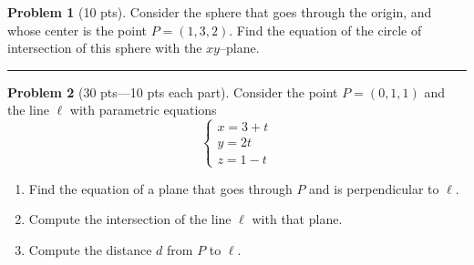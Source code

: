 \documentclass[12pt]{article}
\theoremstyle{definition}
\newtheorem{problem}{Problem}
\begin{document}
\bigskip
\begin{problem}[10 pts]
Consider the sphere that goes through the origin, and whose center is the point $P=(1,3,2)$.  Find the equation of the circle of intersection of this sphere with the $xy$--plane.
\vspace{3cm}
\begin{flushright}
\end{flushright}
\end{problem}
\hrule

\begin{problem}[30 pts---10 pts each part]
Consider the point $P=(0,1,1)$ and the line $\ell$ with parametric equations
\begin{equation*}
\begin{cases}
x = 3+t \\ y = 2t \\ z = 1-t
\end{cases}
\end{equation*}
\begin{enumerate}
\item Find the equation of a plane that goes through $P$ and is perpendicular to $\ell$.
\vspace{2cm}
\begin{flushright}
\end{flushright}
\item  Compute the intersection of the line $\ell$ with that plane.
\vspace{2cm}
\begin{flushright}
\end{flushright}
\item Compute the distance $d$ from $P$ to $\ell$.
\vspace{2cm}
\begin{flushright}
\end{flushright}
\end{enumerate}
\end{problem}
\newpage
\end{document}

